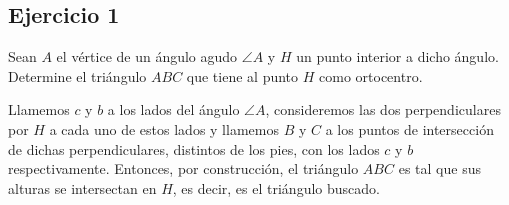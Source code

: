 
\usetikzlibrary{arrows}
\pgfplotsset{compat=1.16}


	\subsection*{Ejercicio 1}
	
	
	Sean $A$ el vértice de un ángulo agudo $\angle A$ y $H$ un punto interior a
	dicho ángulo. Determine el triángulo $ABC$ que tiene al punto $H$ como
	ortocentro.
	
	\begin{sol}
		Llamemos $c$ y $b$ a los lados del ángulo $\angle A$, consideremos las dos perpendiculares por $H$ a cada uno de estos lados y llamemos $B$ y $C$ a los puntos de intersección de dichas perpendiculares, distintos de los pies, con los lados $c$ y $b$ respectivamente. Entonces, por construcción, el triángulo $ABC$ es tal que sus alturas se intersectan en $H$, es decir, es el triángulo buscado.
	\end{sol}


